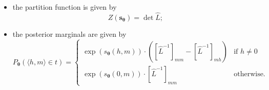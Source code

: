 \begin{itemize}
\begin{itemize}
\item the partition function is given by 
\begin{equation}
Z(\mathbf{s_{\boldsymbol{\theta}}}) = \det \hat{L};
\end{equation}
\item the posterior marginals 
are given by 
\begin{equation}
P_{\boldsymbol{\theta}}(\langle h,m \rangle \in t) = \left\{
\begin{array}{ll}
\exp(s_{\boldsymbol{\theta}}(h,m))\cdot([\hat{L}^{-1}]_{mm} - 
[\hat{L}^{-1}]_{mh}) & \text{if $h \ne 0$}\\
\exp(s_{\boldsymbol{\theta}}(0,m))\cdot[\hat{L}^{-1}]_{mm} & \text{otherwise.}
\end{array}
\right.
\end{equation}
\end{itemize}
\end{itemize}

